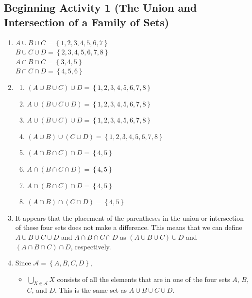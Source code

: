 \documentclass[11pt]{article}
\begin{document}


\subsection*{Beginning Activity 1 (The Union and Intersection of a Family of Sets)}

\begin{enumerate}
\item \begin{multicols}{2}
$A \cup B \cup C = \left\{1, 2, 3, 4, 5, 6, 7 \right\}$ \\
$B \cup C \cup D = \left\{2, 3, 4, 5, 6, 7, 8 \right\}$ \\
$A \cap B \cap C = \left\{3, 4, 5 \right\}$ \\
$B \cap C \cap D = \left\{4, 5, 6 \right\}$ 
\end{multicols}

\item 
\begin{enumerate}
\item $( A \cup B \cup C  ) \cup D = \left\{1, 2, 3, 4, 5, 6, 7, 8 \right\}$
\item $A \cup ( B \cup C  \cup D ) = \left\{1, 2, 3, 4, 5, 6, 7, 8 \right\}$
\item $A \cup ( B \cup C )   \cup D = \left\{1, 2, 3, 4, 5, 6, 7, 8 \right\}$
\item $( A \cup B ) \cup ( C \cup D ) = \left\{1, 2, 3, 4, 5, 6, 7, 8 \right\}$
\item $( A \cap B \cap C  ) \cap D = \left\{4, 5 \right\}$
\item $A \cap ( B \cap C  \cap D ) = \left\{4, 5 \right\}$
\item $A \cap ( B \cap C )   \cap D = \left\{4, 5 \right\}$
\item $( A \cap B ) \cap ( C \cap D ) = \left\{4, 5 \right\}$
\end{enumerate}

\item It appears that the placement of the parentheses in the union or intersection of these four sets does not make a difference.  This means that we can define $A \cup B \cup C \cup D$ and $A \cap B \cap C \cap D$ as $( A \cup B \cup C  ) \cup D$ and 
$( A \cap B \cap C  ) \cap D$, respectively.

\item Since $\mathscr{A} = \left\{A, B, C , D \right\}$,
\begin{itemize}
\item $\bigcup\limits_{X \in \mathscr{A}}^{}X$ consists of all the elements that are in one of the four sets $A$, $B$, $C$, and $D$.  This is the same set as  $A \cup B \cup C \cup D$.


\end{itemize}
\end{enumerate}
\end{document}
